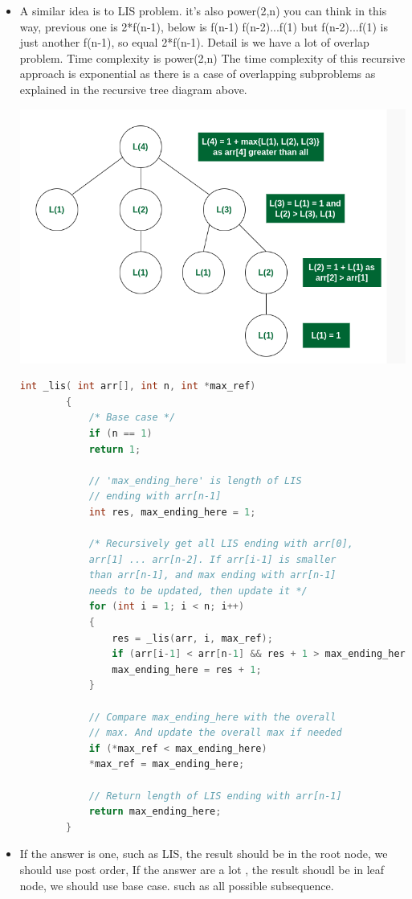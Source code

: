 \documentclass[a4paper,11pt,twoside]{book}
\begin{document}
\begin{itemize}
\begin{itemize}
	\item A similar idea is to LIS problem. it's also power(2,n)
	you can think in this way, previous one is 2*f(n-1), below is f(n-1) f(n-2)...f(1)
	but f(n-2)...f(1) is just another f(n-1), so equal 2*f(n-1). Detail is we have a lot of overlap problem.
	Time complexity is power(2,n) The time complexity of this recursive approach is exponential as there is a case of overlapping subproblems as explained in the recursive tree diagram above.
	\begin{center}
		\includegraphics[width=0.7\linewidth]{pics/lis}
	\end{center}
	
	\begin{lstlisting}[frame=single, language=c++]
		int _lis( int arr[], int n, int *max_ref)
		{
			/* Base case */
			if (n == 1)
			return 1;
			
			// 'max_ending_here' is length of LIS
			// ending with arr[n-1]
			int res, max_ending_here = 1;
			
			/* Recursively get all LIS ending with arr[0],
			arr[1] ... arr[n-2]. If arr[i-1] is smaller
			than arr[n-1], and max ending with arr[n-1]
			needs to be updated, then update it */
			for (int i = 1; i < n; i++)
			{
				res = _lis(arr, i, max_ref);
				if (arr[i-1] < arr[n-1] && res + 1 > max_ending_here)
				max_ending_here = res + 1;
			}
			
			// Compare max_ending_here with the overall
			// max. And update the overall max if needed
			if (*max_ref < max_ending_here)
			*max_ref = max_ending_here;
			
			// Return length of LIS ending with arr[n-1]
			return max_ending_here;
		}
	\end{lstlisting}
	
	
	\item If the answer is one, such as LIS, the result should be in the root node, we should use post order, If the answer are a lot , the result shoudl be in leaf node, we should use base case. such as all possible subsequence. 
	

\end{itemize}
\end{itemize}
\end{document}
